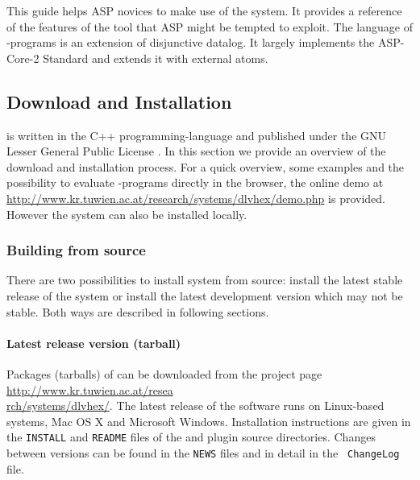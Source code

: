 \documentclass[14pt,a4paper, titlepage]{article}
\begin{document}
This guide helps ASP novices to make use of the system. It 
provides a reference of the features of the tool that ASP 
might be tempted to exploit. The language of \hex{}-programs is an extension of disjunctive datalog. It largely 
implements the ASP-Core-2 Standard \cite{ref} and 
extends it with external atoms. 


\subsection{Download and Installation}
\dlvhex{} is written in the C++ programming-language and 
published under the GNU Lesser General Public License 
\cite{licnc}. In this section we provide an overview of the 
download and installation process. For a quick overview, 
some examples and the possibility to evaluate \hex{}-programs directly in the browser, the online demo at 
\url{http://www.kr.tuwien.ac.at/research/systems/dlvhex/demo.php} 
is provided. However the system can also be installed 
locally. 

\subsubsection{Building from source}
There are two possibilities to install \dlvhex{} system 
from source: install the latest stable release of the 
system or install the latest development version which may 
not be stable. Both ways are described in following 
sections.  

\paragraph{Latest release version (tarball)}
\label{sec:steps}
Packages (tarballs) of \dlvhex{} can be downloaded from the 
project page \url{http://www.kr.tuwien.ac.at/resea} \\ 
\url{rch/systems/dlvhex/}. The latest release of the 
software runs on Linux-based systems, Mac OS X and 
Microsoft Windows. Installation instructions are given in 
the {\tt INSTALL} and {\tt README} files of the \dlvhex{} 
and plugin source directories. Changes between versions can 
be found in the {\tt NEWS} files and in detail in the {\tt 
ChangeLog} file. 
\end{document}
